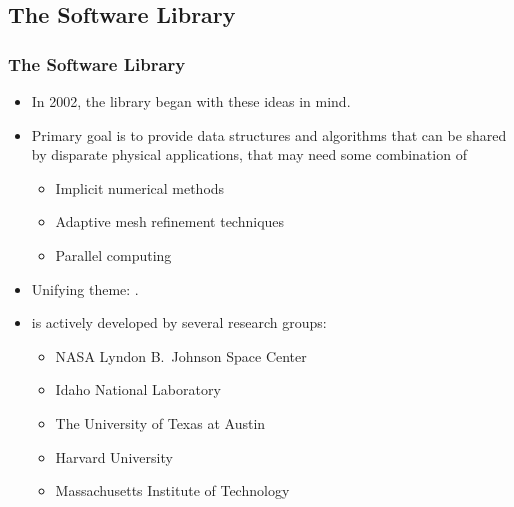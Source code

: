 \subsection{The \libmesh{} Software Library}
\frame
{
  \frametitle{The \libmesh{} Software Library}
  \begin{itemize}
    \item In 2002, the \libmesh{} library began with these ideas in mind.
    \item Primary goal is to provide data structures and algorithms that can be shared by disparate physical applications, that may need some combination of
      \begin{itemize}
      \item Implicit numerical methods
      \item Adaptive mesh refinement techniques
      \item Parallel computing
      \end{itemize}
    \item Unifying theme: .
    \vspace{1em}
    \item \libMesh{} is actively developed by several research groups:
    \begin{itemize}
       \item NASA Lyndon B.\ Johnson Space Center
       \item Idaho National Laboratory
       \item The University of Texas at Austin
       \item Harvard University
       \item Massachusetts Institute of Technology
    \end{itemize}
  \end{itemize}
}





